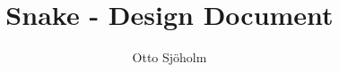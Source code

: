 \documentclass[]{scrartcl}
\title{Snake - Design Document}
\author{Otto Sjöholm}
\begin{document}
\maketitle

\begin{abstract}

\end{abstract}

\section{}
\end{document}
